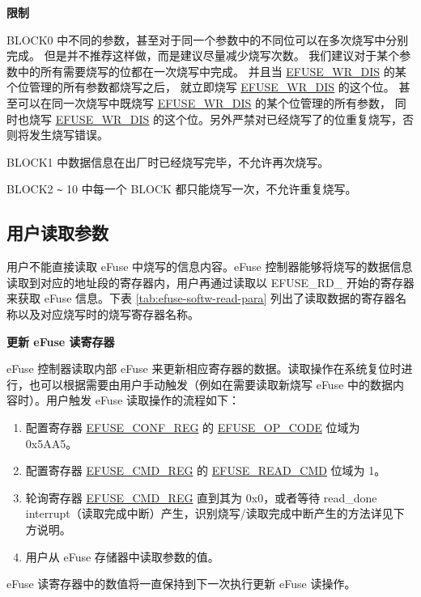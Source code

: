 \documentclass[main\_\_CN.tex]{subfiles}
\begin{document}
{\bfseries 限制}

BLOCK0 中不同的参数，甚至对于同一个参数中的不同位可以在多次烧写中分别完成。
但是并不推荐这样做，而是建议尽量减少烧写次数。
我们建议对于某个参数中的所有需要烧写的位都在一次烧写中完成。
并且当 \hyperref[fielddesc:EFUSEWRDIS]{EFUSE\_WR\_DIS} 的某个位管理的所有参数都烧写之后，
就立即烧写 \hyperref[fielddesc:EFUSEWRDIS]{EFUSE\_WR\_DIS} 的这个位。
甚至可以在同一次烧写中既烧写 \hyperref[fielddesc:EFUSEWRDIS]{EFUSE\_WR\_DIS} 的某个位管理的所有参数，
同时也烧写 \hyperref[fielddesc:EFUSEWRDIS]{EFUSE\_WR\_DIS} 的这个位。另外严禁对已经烧写了的位重复烧写，否则将发生烧写错误。

BLOCK1 中数据信息在出厂时已经烧写完毕，不允许再次烧写。

BLOCK2 \verb+~+ 10 中每一个 BLOCK 都只能烧写一次，不允许重复烧写。


\subsection{用户读取参数}
\label{sec:efuse-software-read-para}

用户不能直接读取 eFuse 中烧写的信息内容。eFuse 控制器能够将烧写的数据信息读取到对应的地址段的寄存器内，用户再通过读取以 EFUSE\_RD\_ 开始的寄存器来获取 eFuse 信息。下表 \ref{tab:efuse-softw-read-para} 列出了读取数据的寄存器名称以及对应烧写时的烧写寄存器名称。



{\bfseries 更新 eFuse 读寄存器}
\label{sec:efuse-update-reg}

eFuse 控制器读取内部 eFuse 来更新相应寄存器的数据。读取操作在系统复位时进行，也可以根据需要由用户手动触发（例如在需要读取新烧写 eFuse 中的数据内容时）。用户触发 eFuse 读取操作的流程如下：
\begin{enumerate}
    \item 配置寄存器 \hyperref[regdesc:EFUSECONFREG]{EFUSE\_CONF\_REG} 的 \hyperref[fielddesc:EFUSEOPCODE]{EFUSE\_OP\_CODE} 位域为 0x5AA5。
    \item 配置寄存器 \hyperref[regdesc:EFUSECMDREG]{EFUSE\_CMD\_REG} 的 \hyperref[fielddesc:EFUSEREADCMD]{EFUSE\_READ\_CMD} 位域为 1。
    \item 轮询寄存器 \hyperref[regdesc:EFUSECMDREG]{EFUSE\_CMD\_REG} 直到其为 0x0，或者等待 read\_done interrupt（读取完成中断）产生，识别烧写/读取完成中断产生的方法详见下方说明。
    \item 用户从 eFuse 存储器中读取参数的值。
\end{enumerate}
eFuse 读寄存器中的数值将一直保持到下一次执行更新 eFuse 读操作。
\end{document}

